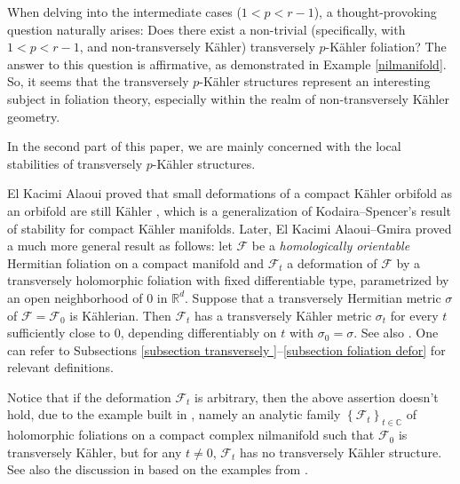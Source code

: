 \documentclass[12pt]{amsart}
\numberwithin{equation}{section}
\theoremstyle{definition}
\theoremstyle{definition}
\theoremstyle{definition}
\renewcommand{\1}{\mathsf{1}}
\renewcommand{\>}{\rightarrow}
\def\mb{\mathbb}
\def\mc{\mathcal}
\theoremstyle{plain} %
\theoremstyle{plain} %
\theoremstyle{plain} %
\begin{document}
When delving into the intermediate cases ($1<p<{r-1}$), a thought-provoking question naturally arises: Does there exist a non-trivial (specifically, with $1<p<{r-1}$, and non-transversely K\"ahler) transversely $p$-K\"ahler foliation? The answer to this question is affirmative, as demonstrated in Example \ref{nilmanifold}.
	So, it seems  that the transversely $p$-K\"ahler structures represent an interesting subject in foliation theory, especially within the realm of non-transversely K\"ahler geometry.
	
	
	
	
	
	
	
	In the second part of this paper, we are mainly concerned with  the local stabilities of transversely $p$-K\"ahler structures.
	
	El Kacimi Alaoui proved that small deformations of a compact K\"ahler orbifold as an orbifold are still K\"ahler \cite{EKA88}, which is a generalization of Kodaira--Spencer's result of stability  for compact K\"ahler manifolds. Later, El Kacimi Alaoui--Gmira \cite{EKAG97}  proved a much more general result as follows: let $\mathcal{F}$ be a \textit{homologically orientable} Hermitian foliation on a compact manifold and $\mathcal{F}_{t}$ a deformation of $\mathcal{F}$ by a transversely holomorphic foliation with fixed differentiable type, parametrized by an open neighborhood of 0 in $\mathbb{R}^{d}$. Suppose that a transversely Hermitian metric $\sigma$ of $\mathcal{F}=\mathcal{F}_{0}$ is K\"ahlerian. Then $\mathcal{F}_{t}$ has a transversely K\"ahler metric $\sigma_{t}$ for every $t$ sufficiently close to 0, depending differentiably on $t$ with $\sigma_{0}=\sigma$. See also \cite[Theorem 5.2]{Ra21}.  One can refer to Subsections \ref{subsection transversely }--\ref{subsection foliation defor} for relevant definitions. 
    
    Notice that if the deformation $\mc F_t$ is arbitrary, then the above assertion doesn't hold, due to the example built in \cite{EKAN90},  namely an analytic family $\left\{\mc F_t\right\}_{t\in\mb C}$ of holomorphic foliations on a compact complex nilmanifold such that $\mc F_0$ is transversely K\"ahler, but for any $t\not=0$, $\mathcal F_t$ has no transversely K\"ahler structure. See also the discussion  in \cite[Section 6]{Ra21} based on the examples  from \cite{No08, GNT16}.
	
	
	
\end{document}
